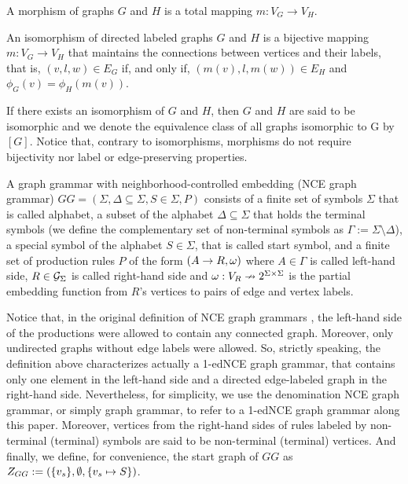\documentclass[runningheads]{llncs}
\begin{document}
\begin{definition}
	\label{def:morphism}
	A morphism of graphs $G$ and $H$ is a total mapping $m: V_G \to V_H$.
\end{definition}

\begin{definition}
	An isomorphism of directed labeled graphs $G$ and $H$ is a bijective mapping $m: V_G \to V_H$ that maintains the connections between vertices and their labels, that is, $(v,l,w) \in E_G$ if, and only if, $(m(v),l,m(w)) \in E_H$ and $\phi_G(v) = \phi_H(m(v))$.
\end{definition}

If there exists an isomorphism of $G$ and $H$, then $G$ and $H$ are said to be isomorphic and we denote the equivalence class of all graphs isomorphic to G by $[G]$. Notice that, contrary to isomorphisms, morphisms do not require bijectivity nor label or edge-preserving properties.

\begin{definition}
	\label{def:gg}
	A graph grammar with neighborhood-controlled embedding (NCE graph grammar) $GG = (\Sigma, \Delta \subseteq \Sigma, S \in \Sigma, P)$ consists of a finite set of symbols $\Sigma$ that is called alphabet, a subset of the alphabet $\Delta \subseteq \Sigma$ that holds the terminal symbols (we define the complementary set of non-terminal symbols as $\Gamma := \Sigma \setminus \Delta$), a special symbol of the alphabet $S \in \Sigma$, that is called start symbol, and a finite set of production rules $P$ of the form $(A \to R, \omega)$ where $A \in \Gamma$ is called left-hand side, $R \in \mathcal{G}_{\Sigma}$ is called right-hand side and $\omega : V_R \nrightarrow 2^{\Sigma \times \Sigma}$ is the partial embedding function from $R$'s vertices to pairs of edge and vertex labels.
\end{definition}

Notice that, in the original definition of NCE graph grammars \cite{janssens1982graph}, the left-hand side of the productions were allowed to contain any connected graph. Moreover, only undirected graphs without edge labels were allowed. So, strictly speaking, the definition above characterizes actually a 1-edNCE graph grammar, that contains only one element in the left-hand side and a directed edge-labeled graph in the right-hand side. Nevertheless, for simplicity, we use the denomination NCE graph grammar, or simply graph grammar, to refer to a 1-edNCE graph grammar along this paper. Moreover, vertices from the right-hand sides of rules labeled by non-terminal (terminal) symbols are said to be non-terminal (terminal) vertices. And finally, we define, for convenience, the start graph of $GG$ as $Z_{GG} := (\{v_s\},\emptyset,\{v_s \mapsto S\})$. 
\end{document}
